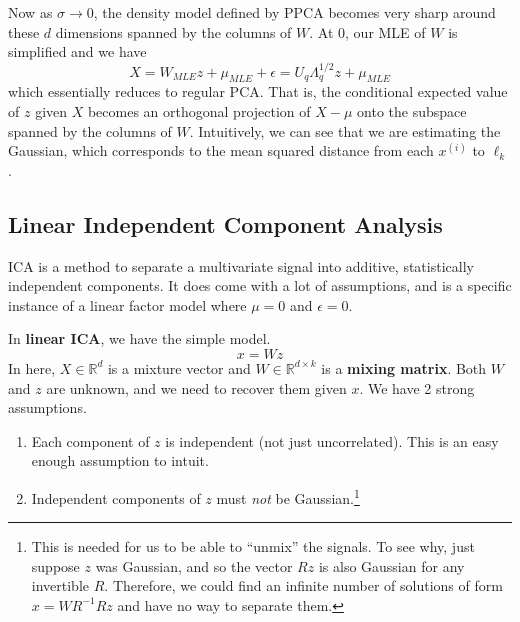   Now as $\sigma \rightarrow 0$, the density model defined by PPCA becomes very sharp around these $d$ dimensions spanned by the columns of $W$. At $0$, our MLE of $W$ is simplified and we have 
  \begin{equation}
    X = W_{MLE} z + \mu_{MLE} + \epsilon = U_q \Lambda_q^{1/2} z + \mu_{MLE}
  \end{equation}
  which essentially reduces to regular PCA. That is, the conditional expected value of $z$ given $X$ becomes an orthogonal projection of $X - \mu$ onto the subspace spanned by the columns of $W$. Intuitively, we can see that we are estimating the Gaussian, which corresponds to the mean squared distance from each $x^{(i)}$ to $\ell_k$. 

\subsection{Linear Independent Component Analysis} 

  ICA is a method to separate a multivariate signal into additive, statistically independent components. It does come with a lot of assumptions, and is a specific instance of a linear factor model where $\mu = 0$ and $\epsilon = 0$. 

  \begin{definition}
    In \textbf{linear ICA}, we have the simple model. 
    \begin{equation}
      x = W z
    \end{equation}
    In here, $X \in \mathbb{R}^d$ is a mixture vector and $W \in \mathbb{R}^{d \times k}$ is a \textbf{mixing matrix}. Both $W$ and $z$ are unknown, and we need to recover them given $x$. We have 2 strong assumptions. 
    \begin{enumerate} 
      \item Each component of $z$ is independent (not just uncorrelated). This is an easy enough assumption to intuit.  
      \item Independent components of $z$ must \textit{not} be Gaussian.\footnote{This is needed for us to be able to ``unmix'' the signals. To see why, just suppose $z$ was Gaussian, and so the vector $Rz$ is also Gaussian for any invertible $R$. Therefore, we could find an infinite number of solutions of form $x = W R^{-1} R z$ and have no way to separate them.}
    \end{enumerate}
  \end{definition}

